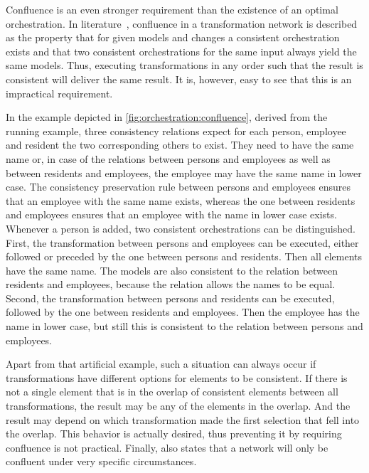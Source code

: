 Confluence is an even stronger requirement than the existence of an optimal orchestration.
In literature~\cite{stevens2020BidirectionalTransformationLarge-SoSym}, confluence in a transformation network is described as the property that for given models and changes a consistent orchestration exists and that two consistent orchestrations for the same input always yield the same models.
Thus, executing transformations in any order such that the result is consistent will deliver the same result.
It is, however, easy to see that this is an impractical requirement.

In the example depicted in \autoref{fig:orchestration:confluence}, derived from the running example, three consistency relations expect for each person, employee and resident the two corresponding others to exist.
They need to have the same name or, in case of the relations between persons and employees as well as between residents and employees, the employee may have the same name in lower case.
The consistency preservation rule between persons and employees ensures that an employee with the same name exists, whereas the one between residents and employees ensures that an employee with the name in lower case exists.
Whenever a person is added, two consistent orchestrations can be distinguished.
First, the transformation between persons and employees can be executed, either followed or preceded by the one between persons and residents. Then all elements have the same name.
The models are also consistent to the relation between residents and employees, because the relation allows the names to be equal.
Second, the transformation between persons and residents can be executed, followed by the one between residents and employees.
Then the employee has the name in lower case, but still this is consistent to the relation between persons and employees.

Apart from that artificial example, such a situation can always occur if transformations have different options for elements to be consistent.
If there is not a single element that is in the overlap of consistent elements between all transformations, the result may be any of the elements in the overlap.
And the result may depend on which transformation made the first selection that fell into the overlap.
This behavior is actually desired, thus preventing it by requiring confluence is not practical.
Finally, \textcite[p. 14]{stevens2020BidirectionalTransformationLarge-SoSym} also states that a network will only be confluent under very specific circumstances.

